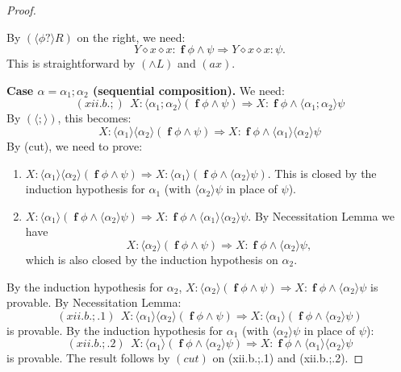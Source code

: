 \documentclass[manuscript,screen]{acmart}
\newcommand{\la}[0]{\langle}
\newcommand{\ra}[0]{\rangle}
\DeclareMathOperator{\seq}{;}
\newcommand{\cat}[0]{\diamond}
\DeclareMathOperator{\ofst}{\mathbf{f}}
\begin{document}
\begin{proof}
\begin{enumerate}
    By $(\la\phi?\ra R)$ on the right, we need:
    $$
    Y\cat x\cat x : \ofst\phi\wedge\psi\Rightarrow Y\cat x \cat x: \psi. 
    $$
    This is straightforward by $(\wedge L)$ and $(ax)$. 
\end{enumerate}

\textbf{Case $\alpha = \alpha_1\seq\alpha_2$ (sequential composition).} We need:
$$
(xii.b.;)\ \ X : \la\alpha_1\seq\alpha_2\ra(\ofst\phi\wedge\psi)\Rightarrow X : \ofst\phi\wedge \la\alpha_1\seq\alpha_2\ra\psi
$$
By $(\la\seq\ra)$, this becomes:
$$
X : \la\alpha_1\ra\la\alpha_2\ra(\ofst\phi\wedge\psi)\Rightarrow X : \ofst\phi\wedge \la\alpha_1\ra\la\alpha_2\ra\psi
$$
By (cut), we need to prove:
\begin{enumerate}
\item[(xii.b.;.1)] $X : \la\alpha_1\ra\la\alpha_2\ra(\ofst\phi\wedge\psi)\Rightarrow X : \la\alpha_1\ra(\ofst\phi\wedge\la\alpha_2\ra\psi)$.
    This is closed by the induction hypothesis for $\alpha_1$ (with $\la\alpha_2\ra\psi$ in place of $\psi$). 
\item[(xii.b.;.2)] $X : \la\alpha_1\ra(\ofst\phi\wedge\la\alpha_2\ra\psi)\Rightarrow X : \ofst\phi\wedge\la\alpha_1\ra\la\alpha_2\ra\psi$. By Necessitation Lemma we have
$$X : \la\alpha_2\ra(\ofst\phi\wedge\psi)\Rightarrow X : \ofst\phi\wedge\la\alpha_2\ra\psi, $$
which is also closed by the induction hypothesis on $\alpha_2$. 
\end{enumerate}

\ifx
By the induction hypothesis for $\alpha_2$, $X : \la\alpha_2\ra(\ofst\phi\wedge\psi)\Rightarrow X : \ofst\phi\wedge\la\alpha_2\ra\psi$ is provable. By Necessitation Lemma:
$$
(xii.b.;.1)\ \ X : \la\alpha_1\ra\la\alpha_2\ra(\ofst\phi\wedge\psi)\Rightarrow X : \la\alpha_1\ra(\ofst\phi\wedge\la\alpha_2\ra\psi)
$$
is provable.
By the induction hypothesis for $\alpha_1$ (with $\la\alpha_2\ra\psi$ in place of $\psi$):
$$
(xii.b.;.2)\ \ X : \la\alpha_1\ra(\ofst\phi\wedge\la\alpha_2\ra\psi)\Rightarrow X : \ofst\phi\wedge\la\alpha_1\ra\la\alpha_2\ra\psi
$$
is provable. 
The result follows by $(\textit{cut})$ on (xii.b.;.1) and (xii.b.;.2).
\fi


\end{proof}
\end{document}
